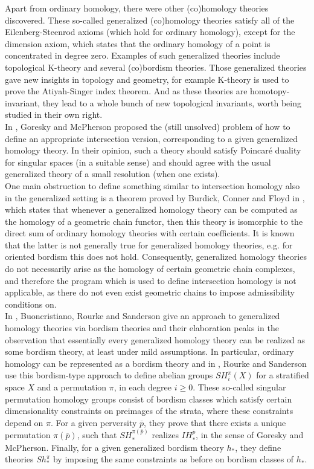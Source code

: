 \documentclass{scrreprt}
\begin{document}
Apart from ordinary homology, there were other (co)homology theories discovered. These so-called generalized (co)homology theories satisfy all of the Eilenberg-Steenrod axioms (which hold for ordinary homology), except for the dimension axiom, which states that the ordinary homology of a point is concentrated in degree zero. Examples of such generalized theories include topological K-theory and several (co)bordism theories. Those generalized theories gave new insights in topology and geometry, for example K-theory is used to prove the Atiyah-Singer index theorem. And as these theories are homotopy-invariant, they lead to a whole bunch of new topological invariants, worth being studied in their own right. \\
In \cite{problemsIH}, Goresky and McPherson proposed the (still unsolved) problem of how to define an appropriate intersection version, corresponding to a given generalized homology theory. In their opinion, such a theory should satisfy Poincar\'{e} duality for singular spaces (in a suitable sense) and should agree with the usual generalized theory of a small resolution (when one exists). \\
One main obstruction to define something similar to intersection homology also in the generalized setting is a theorem proved by Burdick, Conner and Floyd in \cite{bcf}, which states that whenever a generalized homology theory can be computed as the homology of a geometric chain functor, then this theory is isomorphic to the direct sum of ordinary homology theories with certain coefficients. It is known that the latter is not generally true for generalized homology theories, e.g. for oriented bordism this does not hold. Consequently, generalized homology theories do not necessarily arise as the homology of certain geometric chain complexes, and therefore the program which is used to define intersection homology is not applicable, as there do not even exist geometric chains to impose admissibility conditions on. \\
In \cite{BRS}, Buoncristiano, Rourke and Sanderson give an approach to generalized homology theories via bordism theories and their elaboration peaks in the observation that essentially every generalized homology theory can be realized as some bordism theory, at least under mild assumptions. In particular, ordinary homology can be represented as a bordism theory and in \cite{rourkestratifications}, Rourke and Sanderson use this bordism-type approach to define abelian groups $SH_i^{\pi}(X)$ for a stratified space $X$ and a permutation $\pi$, in each degree $i \geq 0$.  These so-called singular permutation homology groups consist of bordism classes which satisfy certain dimensionality constraints on preimages of the strata, where these constraints depend on $\pi$. For a given perversity $\overline{p}$, they prove that there exists a unique permutation $\pi(\overline{p})$, such that $SH_*^{\pi(\overline{p})}$ realizes $IH_*^{\overline{p}}$, in the sense of Goresky and McPherson. Finally, for a given generalized bordism theory $h_*$, they define theories $Sh_*^{\pi}$ by imposing the same constraints as before on bordism classes of $h_*$.\\
\end{document}

